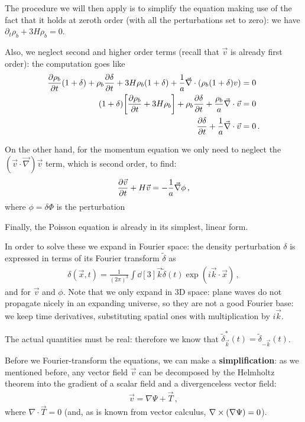 \documentclass[main.tex]{subfiles}
\begin{document}
The procedure we will then apply is to simplify the equation making use of the fact that it holds at zeroth order (with all the perturbations set to zero): we have \(\partial_{t} \rho _b + 3 H \rho_b = 0\).

Also, we neglect second and higher order terms (recall that \(\vec{v}\) is already first order): the computation goes like
%
\begin{align}
  \pdv{\rho_b}{t} \qty(1 + \delta ) + \rho_b \pdv{ \delta }{t}
  + 3 H \rho_b (1 + \delta ) + \frac{1}{a } \vec{\nabla} \cdot (\rho_b (1 +\delta ) v) &= 0 \\
  (1 + \delta ) \qty[\pdv{\rho _b}{t} + 3 H \rho _b] 
  + \rho _b \pdv{ \delta }{t} + \frac{\rho _b}{a} \vec{\nabla} \cdot \vec{v} &= 0 \\
  \pdv{ \delta }{t} + \frac{1}{a} \vec{\nabla} \cdot \vec{v} &= 0
\,.
\end{align}

On the other hand, for the momentum equation we only need to neglect the \((\vec{v} \cdot \vec{\nabla}) \vec{v}\) term, which is second order, to find:
%
\begin{align}
  \pdv{\vec{v}}{t} + H \vec{v} = - \frac{1}{a} \vec{\nabla} \phi 
\,,
\end{align}
%
where \(\phi = \delta \Phi \) is the perturbation 

Finally, the Poisson equation is already in its simplest, linear form.

In order to solve these we expand in Fourier space: the density perturbation \(\delta \) is expressed in terms of its Fourier transform \(\widetilde{\delta}\) as 
%
\begin{align}
  \delta (\vec{x} , t) = 
  \frac{1}{(2 \pi )^3} \int \dd[3]{\vec{k}} \widetilde{\delta} (t) \exp(i \vec{k} \cdot \vec{x})
\,,
\end{align}
%
and for \(\vec{v}\) and \(\phi \). 
Note that we only expand in 3D space: plane waves do not propagate nicely in an expanding universe, so they are not a good Fourier base: we keep time derivatives, substituting spatial ones with multiplication by \(i \vec{k}\).

The actual quantities must be real: therefore we know that \(\widetilde{\delta}^{*}_{\vec{k}} (t) = \widetilde{\delta}_{-\vec{k}} (t)\).

Before we Fourier-transform the equations, we can make a \textbf{simplification}: as we mentioned before, any vector field \(\vec{v}\) can be decomposed by the Helmholtz theorem into the gradient of a scalar field and a divergenceless vector field: 
%
\begin{align}
  \vec{v} = \nabla \Psi + \vec{T}
\,,
\end{align}
%
where \(\nabla \cdot \vec{T} = 0\) (and, as is known from vector calculus, \(\nabla \times \qty(\nabla \Psi ) = 0\)).
\end{document}
